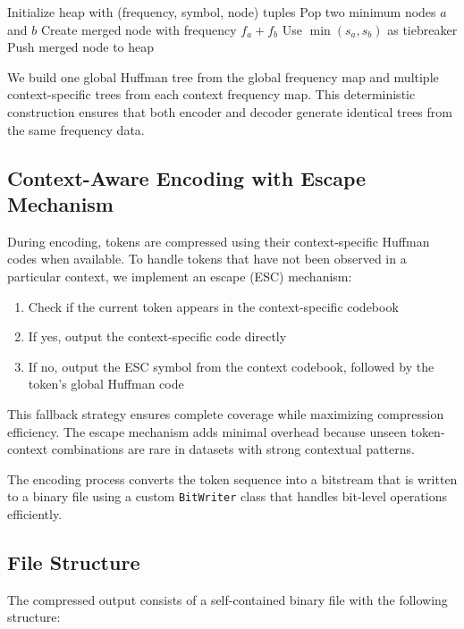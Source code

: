 \documentclass[conference]{IEEEtran}
\begin{document}
\begin{algorithmic}
\STATE Initialize heap with (frequency, symbol, node) tuples
    \STATE Pop two minimum nodes \(a\) and \(b\)
    \STATE Create merged node with frequency \(f_a + f_b\)
    \STATE Use \(\min(s_a, s_b)\) as tiebreaker
    \STATE Push merged node to heap
\ENDWHILE
\end{algorithmic}

We build one global Huffman tree from the global frequency map and multiple context-specific trees from each context frequency map. This deterministic construction ensures that both encoder and decoder generate identical trees from the same frequency data.

\subsection{Context-Aware Encoding with Escape Mechanism}
During encoding, tokens are compressed using their context-specific Huffman codes when available. To handle tokens that have not been observed in a particular context, we implement an escape (ESC) mechanism:

\begin{enumerate}
\item Check if the current token appears in the context-specific codebook
\item If yes, output the context-specific code directly
\item If no, output the ESC symbol from the context codebook, followed by the token's global Huffman code
\end{enumerate}

This fallback strategy ensures complete coverage while maximizing compression efficiency. The escape mechanism adds minimal overhead because unseen token-context combinations are rare in datasets with strong contextual patterns.

The encoding process converts the token sequence into a bitstream that is written to a binary file using a custom \texttt{BitWriter} class that handles bit-level operations efficiently.

\subsection{File Structure}
The compressed output consists of a self-contained binary file with the following structure:
\end{document}
